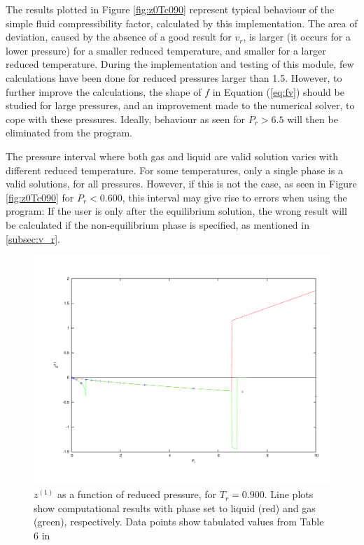 \documentclass[internal,english]{sintefmemo2012}
\numberwithin{equation}{section}
\newcommand*{\reff}[1]{(\ref{#1})}
\begin{document}
The results plotted in Figure \ref{fig:z0Tc090} represent typical behaviour of the simple fluid compressibility factor, calculated by this implementation. The area of deviation, caused by the absence of a good result for $v_r$, is larger (it occurs for a lower pressure) for a smaller reduced temperature, and smaller for a larger reduced temperature. During the implementation and testing of this module, few calculations have been done for reduced pressures larger than 1.5. However, to further improve the calculations, the shape of $f$ in Equation \reff{eq:fv} should be studied for large pressures, and an improvement made to the numerical solver, to cope with these pressures. Ideally, behaviour as seen for $P_r > 6.5$ will then be eliminated from the program.

The pressure interval where both gas and liquid are valid solution varies with different reduced temperature. For some temperatures, only a single phase is a valid solutions, for all pressures. However, if this is not the case, as seen in Figure \ref{fig:z0Tc090} for $P_r < 0.600$, this interval may give rise to errors when using the program: If the user is only after the equilibrium solution, the wrong result will be calculated if the non-equilibrium phase is specified, as mentioned in \ref{subsec:v_r}.

\begin{figure}
	\centering
	\includegraphics[trim = 1.5cm 2cm 0 1cm, clip = true, width=14cm]{z1Tc090}
	\caption{$z^{(1)}$ as a function of reduced pressure, for $T_r = 0.900$. Line plots show computational results with phase set to liquid (red) and gas (green), respectively. Data points show tabulated values from Table 6 in \cite{LK}}
	\label{fig:z1Tc090}
\end{figure}
\end{document}

